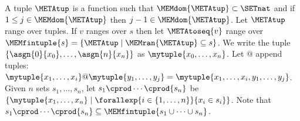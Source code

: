 \documentclass{jfp1}
\newcommand{\sizeintables}{small}
\begin{document}
%
%
%
%
A tuple $\METAtup$ is a function such that $\MEMdom{\METAtup} \subset
\SETnat$ and if $1 \leq j \in \MEMdom{\METAtup}$ then $j - 1
\in \MEMdom{\METAtup}$.
%
Let $\METAtup$ range over tuples.
%
If $v$ ranges over $s$ then let $\METAtoseq{v}$ range
over $\MEMfintuple{s}=\{\METAtup\mid\MEMran{\METAtup}\subseteq{s}\}$.
%
We write the tuple
$\{\asgn{0}{x_0},\dots,\asgn{n}{x_n}\}$ as
$\mytuple{x_0,\dots,x_n}$.
Let $@$ append tuples:
$\mytuple{x_1,\dots,x_i}@\mytuple{y_1,\dots,y_j}
=\mytuple{x_1,\dots,x_i,y_1,\dots,y_j}$.
%
Given $n$ sets $s_1,\dots,s_n$, let $s_1\cprod\cdots\cprod{s_n}$ be
$\{\mytuple{x_1,\dots,x_n}\mid\forallexp{i\in\{1,\dots,n\}}{x_i\in{s_i}}\}$.
Note that
$s_1\cprod\cdots\cprod{s_n}\subseteq\MEMfintuple{s_1\cup\cdots\cup{s_n}}$.
%
%
%
%
\end{document}
